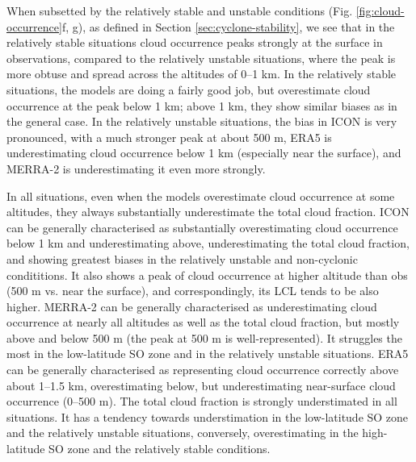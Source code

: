 \documentclass[12pt,a4paper]{article}
\begin{document}
When subsetted by the relatively stable and unstable conditions (Fig.
\ref{fig:cloud-occurrence}f, g), as defined in Section
\ref{sec:cyclone-stability}, we see that in the relatively stable
situations cloud occurrence peaks strongly at the surface in observations,
compared to the relatively unstable situations, where the peak is more obtuse
and spread across the altitudes of 0--1 km.  In the relatively stable
situations, the models are doing a fairly good job, but overestimate cloud
occurrence at the peak below 1 km; above 1 km, they show similar biases as in
the general case.  In the relatively unstable situations, the bias in ICON is
very pronounced, with a much stronger peak at about 500 m, ERA5 is
underestimating cloud occurrence below 1 km (especially near the surface), and
MERRA-2 is underestimating it even more strongly.

In all situations, even when the models overestimate cloud occurrence at some
altitudes, they always substantially underestimate the total cloud fraction.
ICON can be generally characterised as substantially overestimating cloud
occurrence below 1 km and underestimating above, underestimating the total
cloud fraction, and showing greatest biases in the relatively unstable and
non-cyclonic condititions. It also shows a peak of cloud occurrence at higher
altitude than obs (500 m vs. near the surface), and correspondingly, its LCL
tends to be also higher. MERRA-2 can be generally characterised as
underestimating cloud occurrence at nearly all altitudes as well as the total
cloud fraction, but mostly above and below 500 m (the peak at 500 m is
well-represented). It struggles the most in the low-latitude SO zone and in the
relatively unstable situations. ERA5 can be generally characterised as
representing cloud occurrence correctly above about 1--1.5 km, overestimating
below, but underestimating near-surface cloud occurrence (0--500 m). The total
cloud fraction is strongly understimated in all situations. It has a tendency
towards understimation in the low-latitude SO zone and the relatively unstable
situations, conversely, overestimating in the high-latitude SO zone and the
relatively stable conditions.
\end{document}
